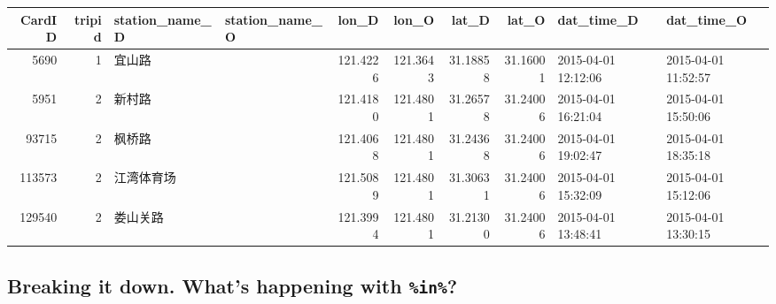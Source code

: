 \documentclass[
  a4paper,
  DIV=11,
  numbers=noendperiod]{scrartcl}
\newenvironment{Shaded}{\begin{snugshade}}{\end{snugshade}}
\newcommand{\FunctionTok}[1]{\textcolor[rgb]{0.28,0.35,0.67}{#1}}
\newcommand{\NormalTok}[1]{\textcolor[rgb]{0.00,0.23,0.31}{#1}}
\newcommand{\SpecialCharTok}[1]{\textcolor[rgb]{0.37,0.37,0.37}{#1}}
\newcommand{\StringTok}[1]{\textcolor[rgb]{0.13,0.47,0.30}{#1}}
\begin{document}
\begin{table}
\centering
\begin{tabular}{r|r|l|>{}l|r|r|r|r|l|l}
\hline
CardID & tripid & station\_name\_D & station\_name\_O & lon\_D & lon\_O & lat\_D & lat\_O & dat\_time\_D & dat\_time\_O\\
\hline
5690 & 1 & 宜山路 & \cellcolor{green}{星中路} & 121.4226 & 121.3643 & 31.18858 & 31.16001 & 2015-04-01 12:12:06 & 2015-04-01 11:52:57\\
\hline
5951 & 2 & 新村路 & \cellcolor{green}{南京东路} & 121.4180 & 121.4801 & 31.26578 & 31.24006 & 2015-04-01 16:21:04 & 2015-04-01 15:50:06\\
\hline
93715 & 2 & 枫桥路 & \cellcolor{green}{南京东路} & 121.4068 & 121.4801 & 31.24368 & 31.24006 & 2015-04-01 19:02:47 & 2015-04-01 18:35:18\\
\hline
113573 & 2 & 江湾体育场 & \cellcolor{green}{南京东路} & 121.5089 & 121.4801 & 31.30631 & 31.24006 & 2015-04-01 15:32:09 & 2015-04-01 15:12:06\\
\hline
129540 & 2 & 娄山关路 & \cellcolor{green}{南京东路} & 121.3994 & 121.4801 & 31.21300 & 31.24006 & 2015-04-01 13:48:41 & 2015-04-01 13:30:15\\
\hline
\end{tabular}
\end{table}

\hypertarget{breaking-it-down.-whats-happening-with-in}{%
\subsection{\texorpdfstring{Breaking it down. What's happening with
\texttt{\%in\%}?}{Breaking it down. What's happening with \%in\%?}}\label{breaking-it-down.-whats-happening-with-in}}

\begin{Shaded}
\end{Shaded}
\end{document}
